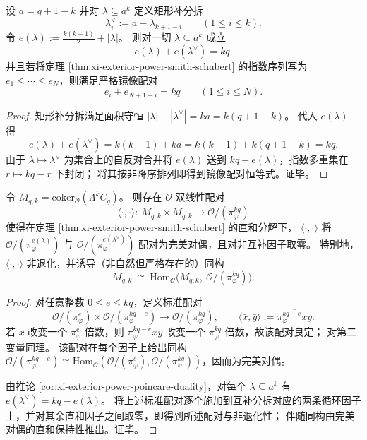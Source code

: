 \begin{corollary}\label{cor:xi-exterior-power-poincare-duality}
设 \(a=q+1-k\) 并对 \(\lambda\subseteq a^k\) 定义矩形补分拆
\[
\lambda^\vee_i:=a-\lambda_{k+1-i}\qquad(1\le i\le k).
\]
令 \(e(\lambda):=\frac{k(k-1)}{2}+|\lambda|\)。
则对一切 \(\lambda\subseteq a^k\) 成立
\[
e(\lambda)+e(\lambda^\vee)=kq.
\]
并且若将定理 \ref{thm:xi-exterior-power-smith-schubert} 的指数序列写为
\(
e_1\le\cdots\le e_N
\)，则满足严格镜像配对
\[
e_i+e_{N+1-i}=kq\qquad(1\le i\le N).
\]
\end{corollary}
\begin{proof}
矩形补分拆满足面积守恒 \( |\lambda|+|\lambda^\vee|=ka=k(q+1-k)\)。
代入 \(e(\lambda)\) 得
\[
e(\lambda)+e(\lambda^\vee)
=k(k-1)+ka
=k(k-1)+k(q+1-k)
=kq.
\]
由于 \(\lambda\mapsto\lambda^\vee\) 为集合上的自反对合并将 \(e(\lambda)\) 送到 \(kq-e(\lambda)\)，指数多重集在 \(r\mapsto kq-r\) 下封闭；
将其按非降序排列即得到镜像配对恒等式。证毕。
\end{proof}

\begin{proposition}\label{prop:xi-exterior-power-perfect-pairing}
令 \(M_{q,k}=\mathrm{coker}_{\mathcal O}(\Lambda^k C_q)\)。
则存在 \(\mathcal O\)-双线性配对
\[
\langle\cdot,\cdot\rangle:\ M_{q,k}\times M_{q,k}\to \mathcal O/(\pi_\varphi^{kq})
\]
使得在定理 \ref{thm:xi-exterior-power-smith-schubert} 的直和分解下，
\(\langle\cdot,\cdot\rangle\) 将 \(\mathcal O/(\pi_\varphi^{e(\lambda)})\) 与 \(\mathcal O/(\pi_\varphi^{e(\lambda^\vee)})\) 配对为完美对偶，且对非互补因子取零。
特别地，\(\langle\cdot,\cdot\rangle\) 非退化，并诱导（非自然但严格存在的）同构
\[
M_{q,k}\ \cong\ \mathrm{Hom}_{\mathcal O}\!\bigl(M_{q,k},\ \mathcal O/(\pi_\varphi^{kq})\bigr).
\]
\end{proposition}
\begin{proof}
对任意整数 \(0\le e\le kq\)，定义标准配对
\[
\mathcal O/(\pi_\varphi^{e})\times \mathcal O/(\pi_\varphi^{kq-e})
\longrightarrow \mathcal O/(\pi_\varphi^{kq}),
\qquad
\langle \bar x,\bar y\rangle:=\overline{\pi_\varphi^{kq-e}xy}.
\]
若 \(x\) 改变一个 \(\pi_\varphi^{e}\)-倍数，则 \(\pi_\varphi^{kq-e}xy\) 改变一个 \(\pi_\varphi^{kq}\)-倍数，故该配对良定；
对第二变量同理。
该配对在每个因子上给出同构
\(
\mathcal O/(\pi_\varphi^{kq-e})\cong \mathrm{Hom}_{\mathcal O}(\mathcal O/(\pi_\varphi^{e}),\mathcal O/(\pi_\varphi^{kq}))
\)，因而为完美对偶。
\par
由推论 \ref{cor:xi-exterior-power-poincare-duality}，对每个 \(\lambda\subseteq a^k\) 有 \(e(\lambda^\vee)=kq-e(\lambda)\)。
将上述标准配对逐个施加到互补分拆对应的两条循环因子上，并对其余直和因子之间取零，即得到所述配对与非退化性；
伴随同构由完美对偶的直和保持性推出。证毕。
\end{proof}

